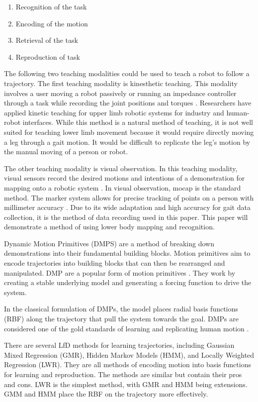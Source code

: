 \begin{enumerate}
    \item Recognition of the task 
    \item Encoding of the motion 
    \item Retrieval of the task 
    \item Reproduction of task 
\end{enumerate} 

The following two teaching modalities could be used to teach a  robot to follow a trajectory. The first teaching modality is kinesthetic teaching. This modality involves a user moving a robot passively or running an impedance controller through a task while recording the joint positions and torques \cite{Calinon2018}. Researchers have applied kinetic teaching for upper limb robotic systems for industry and human-robot interfaces. While this method is a natural method of teaching, it is not well suited for teaching lower limb movement because it would require directly moving a leg through a gait motion. It would be difficult to replicate the leg's motion by the manual moving of a person or robot. 

The other teaching modality is visual observation. In this teaching modality, visual sensors record the desired motions and intentions of a demonstration for mapping onto a robotic system \cite{CalinonLee19}. In visual observation, mocap is the standard method. The marker system allows for precise tracking of points on a person with millimeter accuracy \cite{ott2008motion}. Due to its wide adaptation and high accuracy for gait data collection\cite{ViconGaiting}, it is the method of data recording used in this paper. This paper will demonstrate a method of using lower body mapping and recognition. 

Dynamic Motion Primitives (DMPS) are a method of breaking down demonstrations into their fundamental building blocks. Motion primitives aim to encode trajectories into building blocks that can then be rearranged and manipulated. DMP are a popular form of motion primitives \cite{ijspeert2013dynamical}. They work by creating a stable underlying model and generating a forcing function to drive the system.  

In the classical formulation of DMPs, the model places radial basis functions (RBF) along the trajectory that pull the system towards the goal. DMPs are considered one of the gold standards of learning and replicating human motion \cite{nakanishi2004learning}. 

There are several LfD methods for learning trajectories, including Gaussian Mixed Regression (GMR), Hidden Markov Models (HMM), and Locally Weighted Regression (LWR). They are all methods of encoding motion into basis functions for learning and reproduction. The methods are similar but contain their pros and cons. LWR is the simplest method, with GMR and HMM being extensions. GMM and HMM place the RBF on the trajectory more effectively.  

